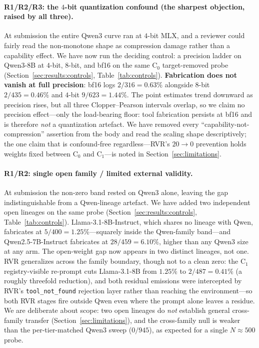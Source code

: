 \paragraph{R1/R2/R3: the $4$-bit quantization confound (the sharpest
objection, raised by all three).}
At submission the entire Qwen3 curve ran at $4$-bit MLX, and a reviewer
could fairly read the non-monotone shape as compression damage rather than
a capability effect. We have now run the deciding control: a precision
ladder on Qwen3-8B at $4$-bit, $8$-bit, and bf16 on the same
$\mathrm{C}_0$ target-removed probe (Section~\ref{sec:results:controls},
Table~\ref{tab:controls}). \textbf{Fabrication does not vanish at full
precision}: bf16 logs $2/316\!=\!0.63\%$ alongside $8$-bit
$2/435\!=\!0.46\%$ and $4$-bit $9/623\!=\!1.44\%$. The point estimates trend
downward as precision rises, but all three Clopper--Pearson intervals
overlap, so we claim no precision effect---only the load-bearing floor:
tool fabrication persists at bf16 and is therefore \emph{not} a
quantization artefact. We have removed every ``capability-not-compression''
assertion from the body and read the scaling shape descriptively; the one
claim that is confound-free regardless---RVR's $20\!\to\!0$ prevention
holds weights fixed between $\mathrm{C}_0$ and $\mathrm{C}_1$---is noted in
Section~\ref{sec:limitations}.

\paragraph{R1/R2: single open family / limited external validity.}
At submission the non-zero band rested on Qwen3 alone, leaving the gap
indistinguishable from a Qwen-lineage artefact. We have added two
independent open lineages on the same probe
(Section~\ref{sec:results:controls}, Table~\ref{tab:controls}).
Llama-3.1-8B-Instruct, which shares no lineage with Qwen, fabricates at
$5/400\!=\!1.25\%$---squarely inside the Qwen-family band---and
Qwen2.5-7B-Instruct fabricates at $28/459\!=\!6.10\%$, higher than any
Qwen3 size at any arm. The open-weight gap now appears in two distinct
lineages, not one. RVR generalizes across the family boundary, though not
to a clean zero: the $\mathrm{C}_1$ registry-visible re-prompt cuts
Llama-3.1-8B from $1.25\%$ to $2/487\!=\!0.41\%$ (a roughly threefold
reduction), and both residual emissions were intercepted by RVR's
\texttt{tool\_not\_found} rejection layer rather than reaching the
environment---so both RVR stages fire outside Qwen even where the prompt
alone leaves a residue. We are deliberate about scope: two open lineages
do \emph{not} establish general cross-family transfer
(Section~\ref{sec:limitations}), and the cross-family null is weaker than
the per-tier-matched Qwen3 sweep ($0/945$), as expected for a single
$N\!\approx\!500$ probe.

